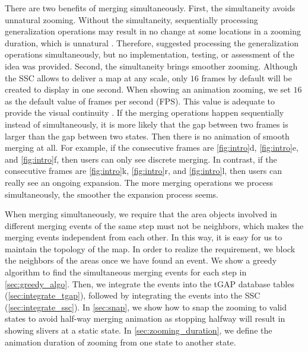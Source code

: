 \documentclass[twocolumn]{svjour3}          %
\begin{document}
There are two benefits of merging simultaneously.
First, the simultaneity avoids unnatural zooming.
Without the simultaneity,
sequentially processing generalization operations 
may result in no change at some locations in a zooming duration, 
which is unnatural \citep{vanOosterom2014Support}. 
Therefore, \citet{vanOosterom2014Support} 
suggested processing the generalization operations simultaneously,
but no implementation, testing, or assessment of the idea was provided.
Second, the simultaneity brings smoother zooming.
Although the SSC allows to deliver a map at any scale,
only $16$ frames by default will be created to display in one second.
When showing an animation zooming, 
we set $16$ as the default value of frames per second (FPS).
This value is adequate to provide the visual continuity
\citep[]{Read2000Film}.
If the merging operations happen sequentially instead of simultaneously,
it is more likely that
the gap between two frames is larger than the gap between two states.
Then there is no animation of smooth merging at all.
For example, if the consecutive frames are 
\figs\ref{fig:intro}d, \ref{fig:intro}e, and \ref{fig:intro}f,
then users can only see discrete merging.
In contrast, if the consecutive frames are 
\figs\ref{fig:intro}k, \ref{fig:intro}r, and \ref{fig:intro}l,
then users can really see an ongoing expansion. 
The more merging operations we process simultaneously, 
the smoother the expansion process seems.


When merging simultaneously,
we require that 
the area objects involved in different merging events of the same step 
must not be neighbors, 
which makes the merging events independent from each other.
In this way, it is easy for us to maintain the topology of the map.
In order to realize the requirement,
we block the neighbors of the areas once we have found an event.
We show a greedy algorithm to find the simultaneous merging events for each step
in \sect\ref{sec:greedy_algo}.
Then, we integrate the events into the tGAP database tables
(\sect\ref{sec:integrate_tgap}),
followed by integrating the events into the SSC 
(\sect\ref{sec:integrate_ssc}).
In \sect\ref{sec:snap}, we show how to snap the zooming to valid states
to avoid half-way merging animation 
as stopping halfway will result in showing slivers at a static state.
In \sect\ref{sec:zooming_duration}, we define 
the animation duration of zooming from one state to another state.
\end{document}
